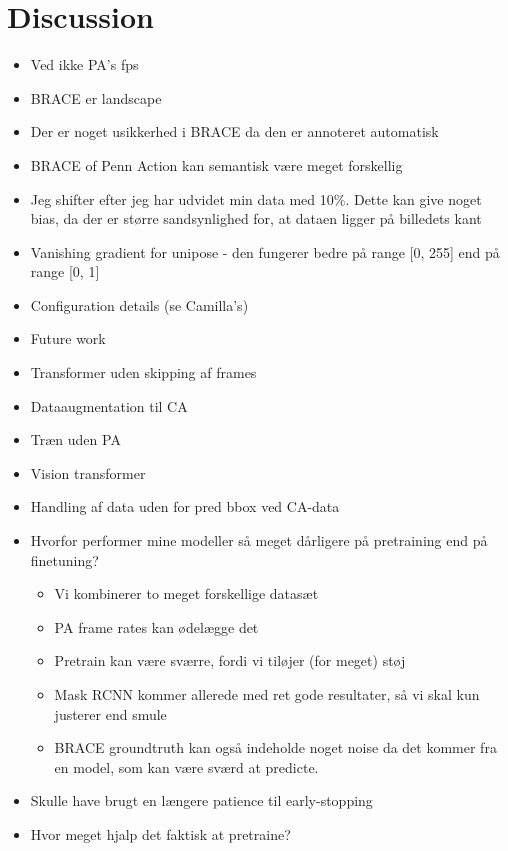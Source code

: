 \documentclass[./main.tex]{subfiles}
\begin{document}
\section{Discussion}
\begin{itemize}
    \item Ved ikke PA's fps
    \item BRACE er landscape
    \item Der er noget usikkerhed i BRACE da den er annoteret automatisk
    \item BRACE of Penn Action kan semantisk være meget forskellig
    \item Jeg shifter efter jeg har udvidet min data med 10\%. Dette kan give noget bias, da der er større sandsynlighed for, at dataen ligger på billedets kant
    \item Vanishing gradient for unipose - den fungerer bedre på range [0, 255] end på range [0, 1]
    \item Configuration details (se Camilla's)
    \item Future work
        \item Transformer uden skipping af frames 
        \item Dataaugmentation til CA
        \item Træn uden PA
        \item Vision transformer
    \item Handling af data uden for pred bbox ved CA-data
    \item Hvorfor performer mine modeller så meget dårligere på pretraining end på finetuning?
    \begin{itemize}
        \item Vi kombinerer to meget forskellige datasæt
        \item PA frame rates kan ødelægge det
        \item Pretrain kan være sværre, fordi vi tiløjer (for meget) støj
        \item Mask RCNN kommer allerede med ret gode resultater, så vi skal kun justerer end smule
        \item BRACE groundtruth kan også indeholde noget noise da det kommer fra en model, som kan være sværd at predicte.
    \end{itemize}
    \item Skulle have brugt en længere patience til early-stopping
    \item Hvor meget hjalp det faktisk at pretraine?
\end{itemize}
\end{document}
